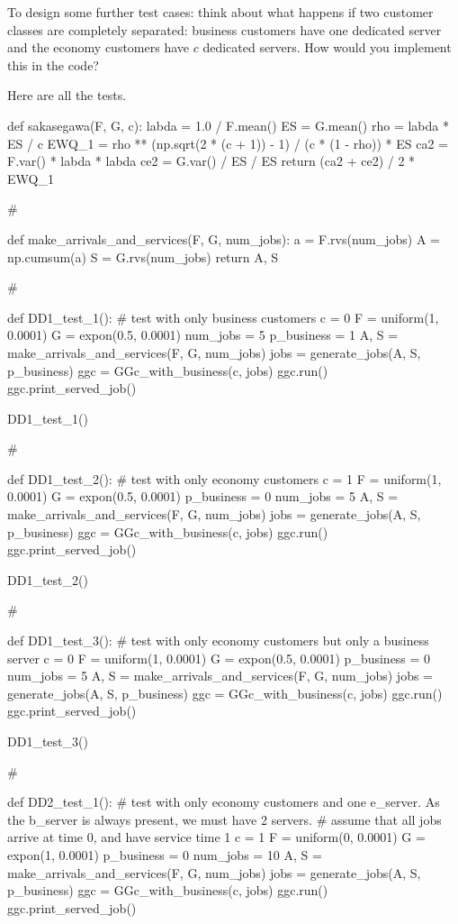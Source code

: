 \begin{exercise}
  To design some further test cases: think about what happens if two customer classes are completely separated:  business customers have one dedicated server and the economy customers have $c$ dedicated servers.  How would you implement this in the code?
\begin{solution}
Here are all the tests.    
\begin{pyverbatim}
def sakasegawa(F, G, c):
    labda = 1.0 / F.mean()
    ES = G.mean()
    rho = labda * ES / c
    EWQ_1 = rho ** (np.sqrt(2 * (c + 1)) - 1) / (c * (1 - rho)) * ES
    ca2 = F.var() * labda * labda
    ce2 = G.var() / ES / ES
    return (ca2 + ce2) / 2 * EWQ_1


# %


def make_arrivals_and_services(F, G, num_jobs):
    a = F.rvs(num_jobs)
    A = np.cumsum(a)
    S = G.rvs(num_jobs)
    return A, S


# %


def DD1_test_1():
    # test with only business customers
    c = 0
    F = uniform(1, 0.0001)
    G = expon(0.5, 0.0001)
    num_jobs = 5
    p_business = 1
    A, S = make_arrivals_and_services(F, G, num_jobs)
    jobs = generate_jobs(A, S, p_business)
    ggc = GGc_with_business(c, jobs)
    ggc.run()
    ggc.print_served_job()


DD1_test_1()

# %


def DD1_test_2():
    # test with only economy customers
    c = 1
    F = uniform(1, 0.0001)
    G = expon(0.5, 0.0001)
    p_business = 0
    num_jobs = 5
    A, S = make_arrivals_and_services(F, G, num_jobs)
    jobs = generate_jobs(A, S, p_business)
    ggc = GGc_with_business(c, jobs)
    ggc.run()
    ggc.print_served_job()


DD1_test_2()

# %


def DD1_test_3():
    # test with only economy customers but only a business server
    c = 0
    F = uniform(1, 0.0001)
    G = expon(0.5, 0.0001)
    p_business = 0
    num_jobs = 5
    A, S = make_arrivals_and_services(F, G, num_jobs)
    jobs = generate_jobs(A, S, p_business)
    ggc = GGc_with_business(c, jobs)
    ggc.run()
    ggc.print_served_job()


DD1_test_3()

# %


def DD2_test_1():
    # test with only economy customers and one e_server. As the b_server is always present, we must have 2 servers.
    # assume that all jobs arrive at time 0, and have service time 1
    c = 1
    F = uniform(0, 0.0001)
    G = expon(1, 0.0001)
    p_business = 0
    num_jobs = 10
    A, S = make_arrivals_and_services(F, G, num_jobs)
    jobs = generate_jobs(A, S, p_business)
    ggc = GGc_with_business(c, jobs)
    ggc.run()
    ggc.print_served_job()



\end{pyverbatim}
\end{solution}
\end{exercise}
